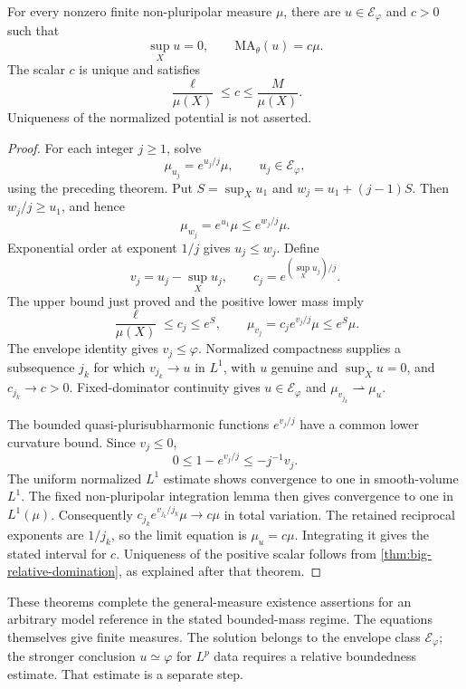 \begin{theorem}\label{thm:big-model-normalized}
For every nonzero finite non-pluripolar measure $\mu$, there are $u\in\mathcal E_\varphi$ and $c>0$ such that
\[
 \sup_Xu=0,\qquad \mathrm{MA}_\theta(u)=c\mu.
\]
The scalar $c$ is unique and satisfies
\[
 \frac{\ell}{\mu(X)}\leq c\leq\frac{M}{\mu(X)}.
\]
Uniqueness of the normalized potential is not asserted.
\end{theorem}
\begin{proof}
For each integer $j\geq1$, solve
\[
 \mu_{u_j}=e^{u_j/j}\mu,\qquad u_j\in\mathcal E_\varphi,
\]
using the preceding theorem. Put $S=\sup_Xu_1$ and $w_j=u_1+(j-1)S$. Then $w_j/j\geq u_1$, and hence
\[
 \mu_{w_j}=e^{u_1}\mu\leq e^{w_j/j}\mu.
\]
Exponential order at exponent $1/j$ gives $u_j\leq w_j$. Define
\[
 v_j=u_j-\sup_Xu_j,\qquad
 c_j=e^{(\sup_Xu_j)/j}.
\]
The upper bound just proved and the positive lower mass imply
\[
 \frac{\ell}{\mu(X)}\leq c_j\leq e^S,
 \qquad \mu_{v_j}=c_j e^{v_j/j}\mu\leq e^S\mu.
\]
The envelope identity gives $v_j\leq\varphi$. Normalized compactness supplies a subsequence $j_k$ for which $v_{j_k}\to u$ in $L^1$, with $u$ genuine and $\sup_Xu=0$, and $c_{j_k}\to c>0$. Fixed-dominator continuity gives $u\in\mathcal E_\varphi$ and $\mu_{v_{j_k}}\rightharpoonup\mu_u$.

The bounded quasi-plurisubharmonic functions $e^{v_j/j}$ have a common lower curvature bound. Since $v_j\leq0$,
\[
 0\leq1-e^{v_j/j}\leq-j^{-1}v_j.
\]
The uniform normalized $L^1$ estimate shows convergence to one in smooth-volume $L^1$. The fixed non-pluripolar integration lemma then gives convergence to one in $L^1(\mu)$. Consequently $c_{j_k}e^{v_{j_k}/j_k}\mu\to c\mu$ in total variation. The retained reciprocal exponents are $1/j_k$, so the limit equation is $\mu_u=c\mu$. Integrating it gives the stated interval for $c$. Uniqueness of the positive scalar follows from \cref{thm:big-relative-domination}, as explained after that theorem.
\end{proof}

These theorems complete the general-measure existence assertions for an arbitrary model reference in the stated bounded-mass regime. The equations themselves give finite measures. The solution belongs to the envelope class $\mathcal E_\varphi$; the stronger conclusion $u\simeq\varphi$ for $L^p$ data requires a relative boundedness estimate. That estimate is a separate step.
